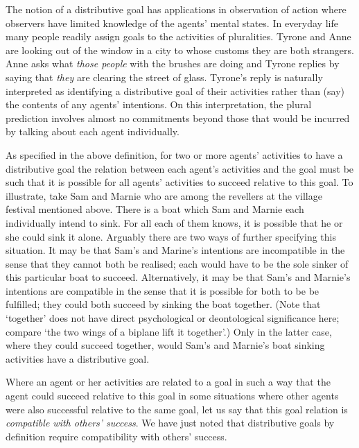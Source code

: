 \documentclass[12pt,a4paper]{extarticle}
\begin{document}
The notion of a distributive goal has applications in observation of action where observers have limited knowledge  of the agents' mental states.
In everyday life many people readily assign goals to the activities of pluralities.  
Tyrone and Anne are looking out of the window in a city to whose customs they are both strangers.  Anne asks what \emph{those people} with the brushes are doing and Tyrone replies by saying that \emph{they} are clearing the street of glass.
Tyrone's reply is naturally interpreted as identifying a distributive goal of their activities rather than (say) the contents of any agents' intentions.
On this interpretation, the plural prediction involves almost no commitments beyond those that would be incurred by talking about each agent individually.

As specified in the above definition, 
	for two or more agents' activities to have a distributive goal 
	the relation between each agent's activities and the goal must be such that it is possible for all agents' activities to succeed relative to this goal.
To illustrate, take Sam and Marnie who are among the revellers at the village festival mentioned above.  There is a boat which Sam and Marnie each individually intend to sink.  
For all each of them knows, it is possible that he or she could sink it alone.
Arguably there are two ways of further specifying this situation.  It may be that Sam's and Marine's intentions are incompatible in the sense that they cannot both be realised; each would have to be the sole sinker of this particular boat to succeed.   Alternatively, it may be that Sam's and Marnie's intentions are compatible in the sense that it is possible for both to be be fulfilled; they could both succeed by sinking the boat together.  
(Note that `together'  does not have direct psychological or deontological significance here; compare `the two wings of a biplane lift it together'.)
Only in the latter case, where they could succeed together, 
 would Sam's and Marnie's boat sinking activities have a distributive goal.


Where an agent or her activities are related to a goal in such a way that the agent could succeed relative to this goal in some situations where other agents were also successful relative to the same goal, let us say that this goal relation is \emph{compatible with others' success}.   
We have just noted that distributive goals by definition require compatibility with others' success.
\end{document}
